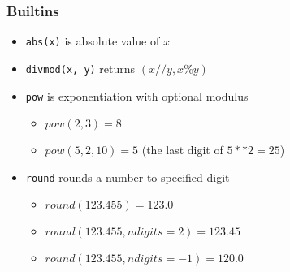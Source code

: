 \documentclass{beamer}
\begin{document}
\begin{frame}
  \frametitle{Builtins}

  \begin{itemize}
  \item \texttt{abs(x)} is absolute value of $x$
  \item \texttt{divmod(x, y)} returns $(x//y, x \% y)$
  \item \texttt{pow} is exponentiation with optional modulus
    \begin{itemize}
      \item $pow(2, 3) = 8$
      \item $pow(5, 2, 10) = 5$ (the last digit of $5**2=25$)
    \end{itemize}
  \item \texttt{round} rounds a number to specified digit
    \begin{itemize}
      \item $round(123.455) = 123.0$
      \item $round(123.455, ndigits=2) = 123.45$
      \item $round(123.455, ndigits=-1) = 120.0$
    \end{itemize}
  \end{itemize}
\end{frame}
\end{document}
